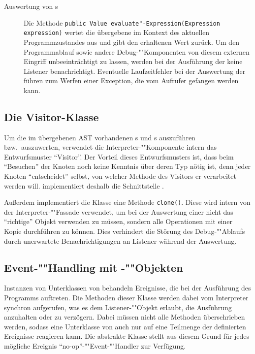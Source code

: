 \begin{description}
    \item[Auswertung von s]
    Die Methode \texttt{public Value evaluate"-Expression(Expression expression)} wertet die übergebene  im Kontext des aktuellen Programmzustandes aus und gibt den erhaltenen Wert zurück. Um den Programmablauf sowie andere Debug-""Komponenten von diesem externen Eingriff unbeeinträchtigt zu lassen, werden bei der Ausführung der  keine Listener benachrichtigt. Eventuelle Laufzeitfehler bei der Auswertung der  führen zum Werfen einer Exception, die vom Aufrufer gefangen werden kann.
\end{description}

\subsection{Die Visitor-Klasse }
Um die im übergebenen AST vorhandenen s und s auszuführen bzw.\ auszuwerten, verwendet die Interpreter-""Komponente intern das Entwurfsmuster ``Visitor''. Der Vorteil dieses Entwurfsmusters ist, dass beim ``Besuchen'' der Knoten noch keine Kenntnis über deren Typ nötig ist, denn jeder Knoten ``entscheidet'' selbst, von welcher Methode des Visitors er verarbeitet werden will.  implementiert deshalb die Schnittstelle .

Außerdem implementiert die Klasse  eine Methode \texttt{clone()}. Diese wird intern von der Interpreter-""Fassade verwendet, um bei der Auswertung einer  nicht das ``richtige'' Objekt verwenden zu müssen, sondern alle Operationen mit einer Kopie durchführen zu können. Dies verhindert die Störung des Debug-""Ablaufs durch unerwartete Benachrichtigungen an Listener während der Auswertung.

\subsection{Event-""Handling mit -""Objekten}
Instanzen von Unterklassen von  behandeln Ereignisse, die bei der Ausführung des Programms auftreten. Die Methoden dieser Klasse werden dabei vom Interpreter synchron aufgerufen, was es dem Listener-""Objekt erlaubt, die Ausführung anzuhalten oder zu verzögern. Dabei müssen nicht alle Methoden überschrieben werden, sodass eine Unterklasse von  auch nur auf eine Teilmenge der definierten Ereignisse reagieren kann. Die abstrakte Klasse  stellt aus diesem Grund für jedes mögliche Ereignis ``no-op''-""Event-""Handler zur Verfügung.

